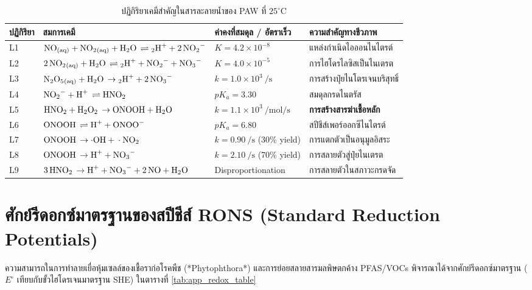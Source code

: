 \begin{table}[H]
\centering
\caption{ปฏิกิริยาเคมีสำคัญในสารละลายน้ำของ PAW ที่ $25^\circ\text{C}$}
\label{tab:app_aqueous_reactions}
\begin{tabularx}{\textwidth}{l l l X}
\toprule
\textbf{ปฏิกิริยา} & \textbf{สมการเคมี} & \textbf{ค่าคงที่สมดุล / อัตราเร็ว} & \textbf{ความสำคัญทางชีวภาพ} \\
\midrule
L1 & $\ce{NO_{(aq)} + NO2_{(aq)} + H2O \rightleftharpoons 2H+ + 2NO2^-}$ & $K = 4.2 \times 10^{-8}$ & แหล่งกำเนิดไอออนไนไตรต์ \\
L2 & $\ce{2NO2_{(aq)} + H2O \rightleftharpoons 2H+ + NO2^- + NO3^-}$ & $K = 4.0 \times 10^{-5}$ & การไฮโดรไลซิสเป็นไนเตรต \\
L3 & $\ce{N2O5_{(aq)} + H2O \to 2H+ + 2NO3^-}$ & $k = 1.0 \times 10^3\ \si{\per\second}$ & การสร้างปุ๋ยไนโตรเจนบริสุทธิ์ \\
L4 & $\ce{NO2^- + H+ \rightleftharpoons HNO2}$ & $pK_a = 3.30$ & สมดุลกรดไนตรัส \\
L5 & $\ce{HNO2 + H2O2 \to ONOOH + H2O}$ & $k = 1.1 \times 10^3\ \si{\per\mole\per\second}$ & \textbf{การสร้างสารฆ่าเชื้อหลัก} \\
L6 & $\ce{ONOOH \rightleftharpoons H+ + ONOO^-}$ & $pK_a = 6.80$ & สปีชีส์เพอร์ออกซีไนไตรต์ \\
L7 & $\ce{ONOOH \to \cdot OH + \cdot NO2}$ & $k = 0.90\ \si{\per\second}$ (30\% yield) & การแตกตัวเป็นอนุมูลอิสระ \\
L8 & $\ce{ONOOH \to H+ + NO3^-}$ & $k = 2.10\ \si{\per\second}$ (70\% yield) & การสลายตัวสู่ปุ๋ยไนเตรต \\
L9 & $\ce{3HNO2 \to H+ + NO3^- + 2NO + H2O}$ & Disproportionation & การสลายตัวในสภาวะกรดจัด \\
\bottomrule
\end{tabularx}
\end{table}

\section{ศักย์รีดอกซ์มาตรฐานของสปีชีส์ RONS (Standard Reduction Potentials)}
\label{app:sec_redox_potentials}

ความสามารถในการทำลายเยื่อหุ้มเซลล์ของเชื้อราก่อโรคพืช (*Phytophthora*) และการย่อยสลายสารมลพิษตกค้าง PFAS/VOCs พิจารณาได้จากศักย์รีดอกซ์มาตรฐาน ($E^\circ$ เทียบกับขั้วไฮโดรเจนมาตรฐาน SHE) ในตารางที่ \ref{tab:app_redox_table}

